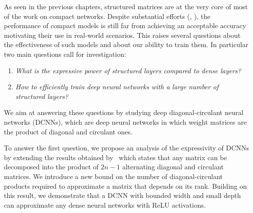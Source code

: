 As seen in the previous chapters, structured matrices are at the very core of most of the work on compact networks.
Despite substantial efforts  (\eg, \citet{cheng2015exploration,moczulski2016acdc}), the performance of compact models is still far from achieving an acceptable accuracy motivating their use in real-world scenarios.
This raises several questions about the effectiveness of such models and about our ability to train them.
In particular two main questions call for investigation:
\begin{enumerate}
    \item \emph{What is the expressive power of structured layers compared to dense layers?}
    \item \emph{How to efficiently train deep neural networks with a large number of structured layers?}
\end{enumerate}
We aim at answering these questions by studying deep diagonal-circulant neural networks (\aka DCNNs), which are deep neural networks in which weight matrices are the product of diagonal and circulant ones.

To answer the first question, we propose an analysis of the expressivity of DCNNs by extending the results obtained by~\citet{huhtanen2015factoring} which states that any matrix can be decomposed into the product of $2n-1$ alternating diagonal and circulant matrices.
We introduce a new bound on the number of diagonal-circulant products required to approximate a matrix that depends on its rank.
Building on this result, we demonstrate that a DCNN with bounded width and small depth can approximate any dense neural networks with ReLU activations. 

